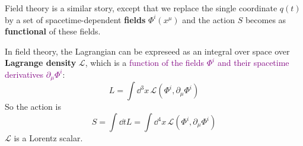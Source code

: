 Field theory is a similar story, except that we replace the single coordinate $q(t)$ by a set of spacetime-dependent \textbf{fields} $\Phi^{i}(x^\mu)$ and the action $S$ becomes as \textbf{functional} of these fields.

In field theory, the Lagrangian can be expreseed as an integral over space over \textbf{Lagrange density} $\mathcal{L}$, which is a \textcolor{purple}{function of the fields $\Phi^{i}$ and their spacetime derivatives $\partial_\mu \Phi^{i}$}:
\begin{equation*}
    L=\int\dd^3 x\,\mathcal{L}(\Phi^{i},\partial_\mu\Phi^{i})
\end{equation*}
So the action is
\begin{equation*}
    S=\int\dd t L=\int\dd^4x\, \mathcal{L}(\Phi^{i},\partial_\mu\Phi^{i})
\end{equation*}
$\mathcal{L}$ is a Lorentz scalar.

